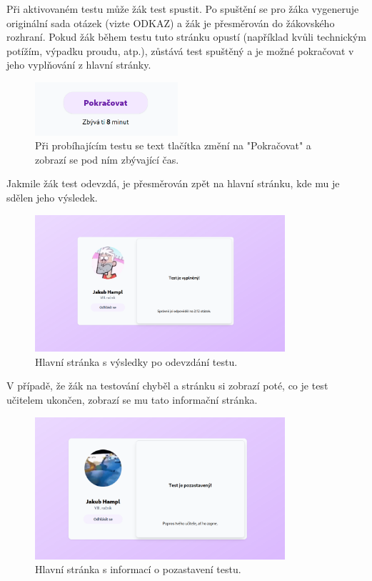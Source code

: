 Při aktivovaném testu může žák test spustit. Po spuštění se pro žáka vygeneruje originální sada otázek (vizte ODKAZ) a žák je přesměrován do žákovského rozhraní. Pokud žák během testu tuto stránku opustí (například kvůli technickým potížím, výpadku proudu, atp.), zůstává test spuštěný a je možné pokračovat v jeho vyplňování z hlavní stránky. 

\begin{figure}[H]
    \centering
    \includegraphics[width=200px]{images/01design/continue.png}
    \caption{Při probíhajícím testu se text tlačítka změní na "Pokračovat" a zobrazí se pod ním zbývající čas.}
\end{figure}

Jakmile žák test odevzdá, je přesměrován zpět na hlavní stránku, kde mu je sdělen jeho výsledek.

\begin{figure}[H]
    \centering
    \includegraphics[width=350px]{images/01design/filled-out.png}
    \caption{Hlavní stránka s výsledky po odevzdání testu.}
\end{figure}

V případě, že žák na testování chyběl a stránku si zobrazí poté, co je test učitelem ukončen, zobrazí se mu tato informační stránka.

\begin{figure}[H]
    \centering
    \includegraphics[width=350px]{images/01design/pending.png}
    \caption{Hlavní stránka s informací o pozastavení testu.}
\end{figure}

